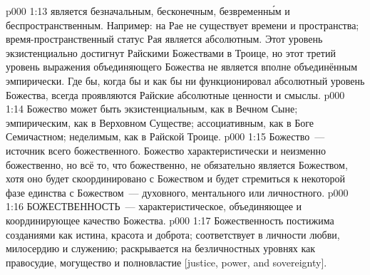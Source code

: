 \vs p000 1:13 \pc {} является безначальным, бесконечным, безвременн\'ым и беспространственным. Например: на Рае не существует времени и пространства; время\hyp{}пространственный статус Рая является абсолютным. Этот уровень экзистенциально достигнут Райскими Божествами в Троице, но этот третий уровень выражения объединяющего Божества не является вполне объединённым эмпирически. Где бы, когда бы и как бы ни функционировал абсолютный уровень Божества, всегда проявляются Райские абсолютные ценности и смыслы.
\vs p000 1:14 \pc Божество может быть экзистенциальным, как в Вечном Сыне; эмпирическим, как в Верховном Существе; ассоциативным, как в Боге Семичастном; неделимым, как в Райской Троице.
\vs p000 1:15 Божество~--- источник всего божественного. Божество характеристически и неизменно божественно, но всё то, что божественно, не обязательно является Божеством, хотя оно будет скоординировано с Божеством и будет стремиться к некоторой фазе единства с Божеством~--- духовного, ментального или личностного.
\vs p000 1:16 \pc БОЖЕСТВЕННОСТЬ~--- характеристическое, объединяющее и координирующее качество Божества.
\vs p000 1:17 Божественность постижима созданиями как истина, красота и доброта; соответствует в личности любви, милосердию и служению; раскрывается на безличностных уровнях как правосудие, могущество и полновластие [justice, power, and sovereignty].
